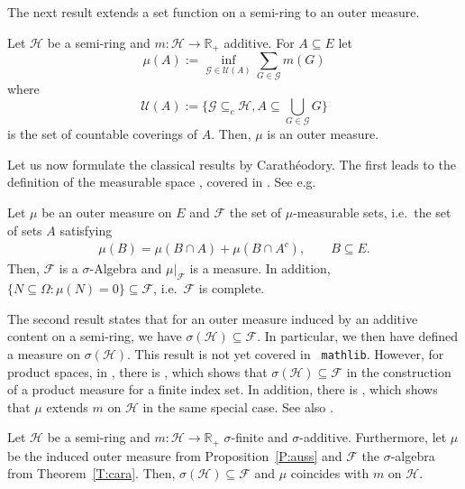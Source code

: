 \documentclass[lean]{AFM}
\begin{document}
The next result extends a set function on a semi-ring to an outer measure.

\begin{proposition} %
  Let \label{P:auss} $\mathcal H$ be a semi-ring and $m: \mathcal
  H\to\mathbb R_+$ additive. For $A\subseteq E$ let
  $$ \mu(A) := \inf_{\mathcal G \in \mathcal U(A)}
    \sum_{G\in\mathcal G} m(G)$$ where
  $$ \mathcal U(A) := \big\{\mathcal G \subseteq_c \mathcal H,
    A\subseteq \bigcup_{G\in\mathcal G} G\big\}$$ is the set of
    countable coverings of $A$. Then, $\mu$ is an outer measure.
\end{proposition}

\sloppy Let us now formulate the classical results by
Carathéodory. The first leads to the definition of the measurable
space , covered in
. See e.g.\ \cite[Theorem 2.1]{Kallenberg2020}

\begin{theorem}\label{T:cara} Let $\mu$ be an outer measure on
  $E$ and $\mathcal F$ the set of $\mu$-measurable sets,
  i.e.\ the set of sets $A$ satisfying
  \begin{align*}
    \mu(B) = \mu(B\cap A) + \mu(B\cap A^c), \qquad B \subseteq E.
  \end{align*}
  Then, $\mathcal F$ is a $\sigma$-Algebra and $\mu|_{\mathcal F}$ is
  a measure. In addition, $\{N\subseteq \Omega:
  \mu(N)=0\}\subseteq \mathcal F$, i.e.\ $\mathcal F$ is complete.
\end{theorem}

\noindent
\sloppy The second result states that for an outer measure induced by
an additive content on a semi-ring, we have $\sigma(\mathcal H)
\subseteq \mathcal F$. In particular, we then have defined a measure
on $\sigma(\mathcal H)$. This result is not yet covered in {\tt
  mathlib}. However, for product spaces, in
, there is
, which shows that $\sigma(\mathcal H)
\subseteq \mathcal F$ in the construction of a product
  measure for a finite index set. In addition, there is
, which shows that $\mu$ extends $m$ on $\mathcal
H$ in the same special case. See also \cite[Theorem
  2.5]{Kallenberg2020}.

\begin{theorem}\label{T:masseind}
  Let $\mathcal H$ be a semi-ring and $m: \mathcal H\to\mathbb R_+$
  $\sigma$-finite and $\sigma$-additive. Furthermore, let $\mu$ be the
  induced outer measure from Proposition~\ref{P:auss} and $\mathcal F$
  the $\sigma$-algebra from Theorem~\ref{T:cara}. Then,
  $\sigma(\mathcal H)\subseteq\mathcal F$ and $\mu$ coincides with $m$
  on $\mathcal H$.
\end{theorem}
\end{document}
